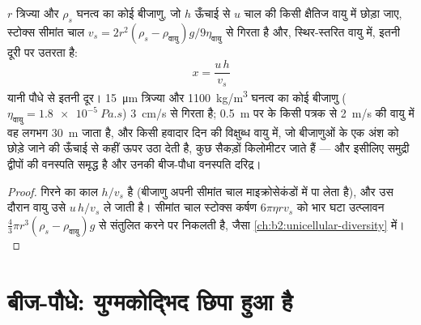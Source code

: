 \begin{theorem}[किसी बीजाणु का प्रकीर्णन]\label{thm:b2:plant-life-cycles:dispersal}
$r$ त्रिज्या और $\rho_s$ घनत्व का कोई बीजाणु, जो $h$ ऊँचाई से $u$ चाल की
किसी क्षैतिज वायु में छोड़ा जाए, स्टोक्स सीमांत चाल
$v_s = 2r^2(\rho_s - \rho_{\text{वायु}})g/9\eta_{\text{वायु}}$ से गिरता
है और, स्थिर-स्तरित वायु में, इतनी दूरी पर उतरता है:
\[
x = \frac{u\,h}{v_s}
\]
यानी पौधे से इतनी दूर। \qty{15}{\micro m} त्रिज्या और
\qty{1100}{kg/m^3} घनत्व का कोई  बीजाणु ($\eta_{\text{वायु}} = \qty{1.8e-5}{Pa.s}$)
\qty{3}{cm/s} से गिरता है; \qty{0.5}{m} पर के किसी पत्रक से
\qty{2}{m/s} की वायु में वह लगभग \qty{30}{m} जाता है, और किसी हवादार दिन
की विक्षुब्ध वायु में, जो बीजाणुओं के एक अंश को छोड़े जाने की ऊँचाई से
कहीं ऊपर उठा देती है, कुछ सैकड़ों किलोमीटर जाते हैं --- और इसीलिए
समुद्री द्वीपों की  वनस्पति समृद्ध है और उनकी बीज-पौधा वनस्पति
दरिद्र।
\end{theorem}
\begin{proof}
गिरने का काल $h/v_s$ है (बीजाणु अपनी सीमांत चाल माइक्रोसेकंडों में पा
लेता है), और उस दौरान वायु उसे $u\,h/v_s$ ले जाती है। सीमांत
चाल स्टोक्स कर्षण $6\pi\eta r
v_s$ को भार घटा उत्प्लावन $\tfrac43\pi r^3(\rho_s -
\rho_{\text{वायु}})g$ से संतुलित करने पर निकलती है, जैसा \cref{ch:b2:unicellular-diversity} में।
\end{proof}

\section{बीज-पौधे: युग्मकोद्भिद छिपा हुआ है}

